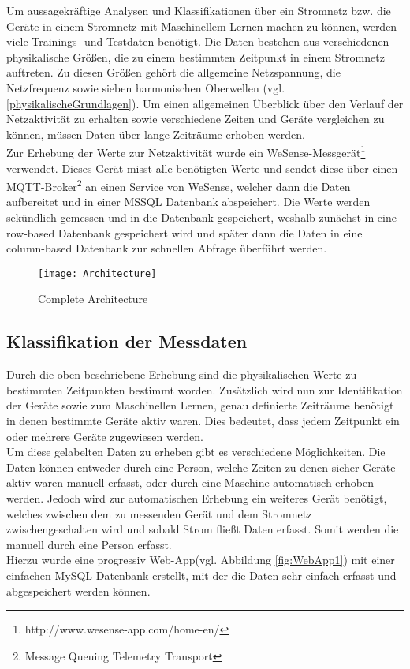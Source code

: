     Um aussagekräftige Analysen und Klassifikationen über ein Stromnetz bzw. die Geräte in einem Stromnetz mit Maschinellem Lernen machen zu können, werden viele Trainings- und Testdaten benötigt.
    Die Daten bestehen aus verschiedenen physikalische Größen, die zu einem bestimmten Zeitpunkt in einem Stromnetz auftreten.
    Zu diesen Größen gehört die allgemeine Netzspannung, die Netzfrequenz sowie sieben harmonischen Oberwellen (vgl. \ref{physikalischeGrundlagen}).
    Um einen allgemeinen Überblick über den Verlauf der Netzaktivität zu erhalten sowie verschiedene Zeiten und Geräte vergleichen zu können, müssen Daten über lange Zeiträume erhoben werden.\\
    \newline
    Zur Erhebung der Werte zur Netzaktivität wurde ein WeSense-Messgerät\footnote{http://www.wesense-app.com/home-en/} verwendet.
    Dieses Gerät misst alle benötigten Werte und sendet diese über einen MQTT-Broker\footnote{Message Queuing Telemetry Transport} an einen Service von WeSense, welcher dann die Daten aufbereitet und in einer MSSQL Datenbank abspeichert.
    Die Werte werden sekündlich gemessen und in die Datenbank gespeichert, weshalb zunächst in eine row-based Datenbank gespeichert wird und später dann die Daten in eine column-based Datenbank zur schnellen Abfrage überführt werden.
    \newline

    \begin{figure}[h]
        \centering
        \texttt{[image: Architecture]}
        \caption{Complete Architecture}
        \label{fig:Architecture}
    \end{figure}

    \subsection{Klassifikation der Messdaten}\label{KlassifikationDerMessdaten}

        Durch die oben beschriebene Erhebung sind die physikalischen Werte zu bestimmten Zeitpunkten bestimmt worden.
        Zusätzlich wird nun zur Identifikation der Geräte sowie zum Maschinellen Lernen, genau definierte Zeiträume benötigt in denen bestimmte Geräte aktiv waren.
        Dies bedeutet, dass jedem Zeitpunkt ein oder mehrere Geräte zugewiesen werden. \\
        \newline
        Um diese gelabelten Daten zu erheben gibt es verschiedene Möglichkeiten.
        Die Daten können entweder durch eine Person, welche Zeiten zu denen sicher Geräte aktiv waren manuell erfasst, oder durch eine Maschine automatisch erhoben werden.
        Jedoch wird zur automatischen Erhebung ein weiteres Gerät benötigt, welches zwischen dem zu messenden Gerät und dem Stromnetz zwischengeschalten wird und sobald Strom fließt Daten erfasst.
        Somit werden die manuell durch eine Person erfasst.\\
        \newline
        Hierzu wurde eine progressiv Web-App(vgl. Abbildung \ref{fig:WebApp1}) mit einer einfachen MySQL-Datenbank erstellt, mit der die Daten sehr einfach erfasst und abgespeichert werden können.

